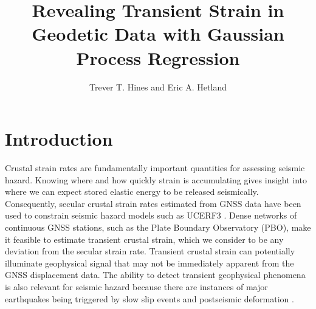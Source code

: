 \documentclass[10pt,letter]{article}
\title{Revealing Transient Strain in Geodetic Data with Gaussian Process Regression}
\author{Trever T. Hines and Eric A. Hetland}
\begin{document}
\maketitle


\section{Introduction}\label{sec:Introduction}
Crustal strain rates are fundamentally important quantities for assessing seismic hazard. Knowing where and how quickly strain is accumulating gives insight into where we can expect stored elastic energy to be released seismically. Consequently, secular crustal strain rates estimated from GNSS data have been used to constrain seismic hazard models such as UCERF3 \citep{Field2014}. Dense networks of continuous GNSS stations, such as the Plate Boundary Observatory (PBO), make it feasible to estimate transient crustal strain, which we consider to be any deviation from the secular strain rate.  Transient crustal strain can potentially illuminate geophysical signal that may not be immediately apparent from the GNSS displacement data. The ability to detect transient geophysical phenomena is also relevant for seismic hazard because there are instances of major earthquakes being triggered by slow slip events \citep{Roeloffs2006} and postseismic deformation \citep{Freed2001}. 
\end{document}

